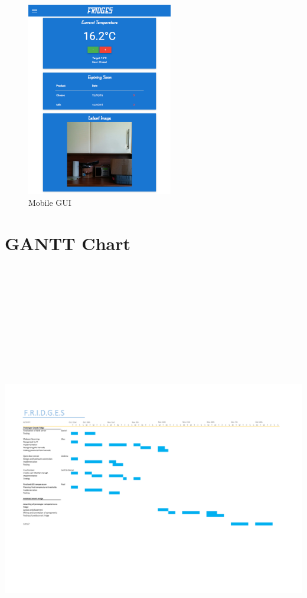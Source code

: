 \documentclass[10pt]{article}
\begin{document}
\begin{figure}[h]
\centering
\caption{Mobile GUI}
\label{Mobile GUI}
\includegraphics[height=8.5cm]{images/Mobile-Screenshot.png}
\end{figure}

\newpage
\section{GANTT Chart}
\includegraphics[height=20cm, width=23cm,angle=-90]{GANTT.pdf}
\end{document}
